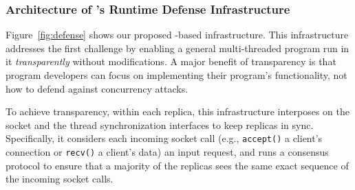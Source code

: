 \vspace{-.15in}\subsubsection{Architecture of \xxx's Runtime Defense 
Infrastructure} 
\label{sec:defense-arch}\vspace{-.075in}

Figure~\ref{fig:defense} shows our proposed \smr-based infrastructure. This infrastructure 
addresses the first challenge by 
enabling a general multi-threaded program run in it \emph{transparently} 
without modifications. A major benefit of transparency is that program 
developers can focus on implementing their program's functionality, not how to 
defend against concurrency attacks.

To achieve transparency, within each \smr replica, this 
infrastructure interposes on the socket and the thread synchronization 
interfaces to keep replicas in sync. Specifically, it considers each incoming socket call (e.g., \texttt{accept()} a 
client's connection or \texttt{recv()} a client's data) an input request, and 
runs a \paxos consensus protocol to ensure that a majority of the replicas sees 
the same exact sequence of the incoming socket calls.




